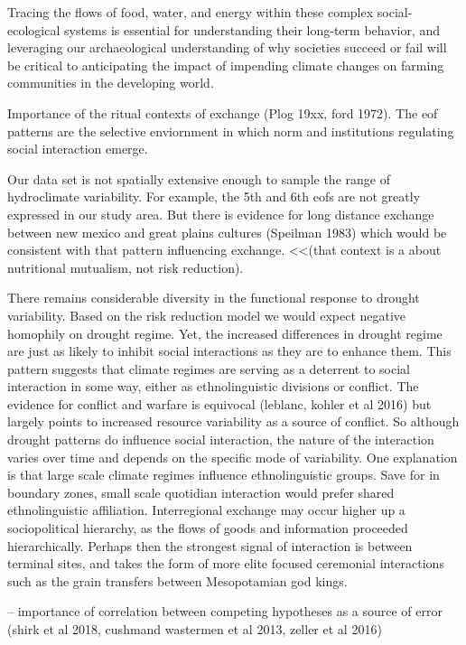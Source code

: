 \documentclass[11pt]{wlscirep}
\begin{document}
Tracing the flows of food, water, and energy within these complex social-ecological systems is essential for understanding their long-term behavior, and leveraging our archaeological understanding of why societies succeed or fail will be critical to anticipating the impact of impending climate changes on farming communities in the developing world.

Importance of the ritual contexts of exchange (Plog 19xx, ford 1972). The eof patterns are the selective enviornment in which norm and institutions regulating social interaction emerge. 

Our data set is not spatially extensive enough to sample the range of hydroclimate variability. For example, the 5th and 6th eofs are not greatly expressed in our study area. But there is evidence for long distance exchange between new mexico and great plains cultures (Speilman 1983) which would be consistent with that pattern influencing exchange. <<(that context is a about nutritional mutualism, not risk reduction).

There remains considerable diversity in the functional response to drought variability. Based on the risk reduction model we would expect negative homophily on drought regime. Yet, the increased differences in drought regime are just as likely to inhibit social interactions as they are to enhance them. This pattern suggests that climate regimes are serving as a deterrent to social interaction in some way, either as ethnolinguistic divisions or conflict. The evidence for conflict and warfare is equivocal (leblanc, kohler et al 2016) but largely points to increased resource variability as a source of conflict. So although drought patterns do influence social interaction, the nature of the interaction varies over time and depends on the specific mode of variability. One explanation is that large scale climate regimes influence ethnolinguistic groups. Save for in boundary zones, small scale quotidian interaction would prefer shared ethnolinguistic affiliation. Interregional exchange may occur higher up a sociopolitical hierarchy, as the flows of goods and information proceeded hierarchically. Perhaps then the strongest signal of interaction is between terminal sites, and takes the form of more elite focused ceremonial interactions such as the grain transfers between Mesopotamian god kings.

-- importance of correlation between competing hypotheses as a source of error (shirk et al 2018, cushmand wastermen et al 2013, zeller et al 2016)
\end{document}
